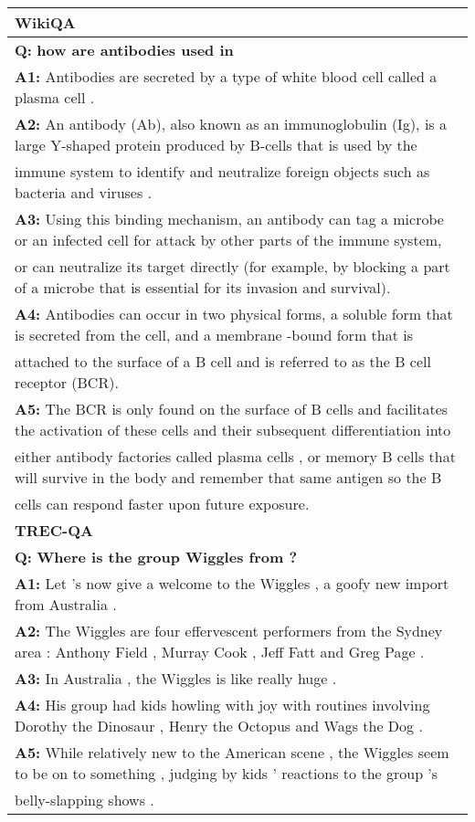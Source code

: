\begin{table*}[t!]
{\begin{tabular}{l}
    \textbf{WikiQA} \\
    \midrule
    \textbf{Q:} \textbf{how are antibodies used in} \\
    \textbf{A1:} {\color{red} Antibodies are secreted by a type of white blood cell called a plasma cell .}\\
    \textbf{A2:} {\color{BlueGreen} An antibody (Ab), also known as an immunoglobulin (Ig), is a large Y-shaped protein produced by B-cells that is used by the }\\{\color{BlueGreen} immune system to identify and neutralize foreign objects such as bacteria and viruses .}\\
    \textbf{A3:}  {\color{ForestGreen}Using this binding mechanism, an antibody can tag a microbe or an infected cell for attack by other parts of the immune system, }\\{\color{ForestGreen}or can neutralize its target directly (for example, by blocking a part of a microbe that is essential for its invasion and survival).} \\
    \textbf{A4:} Antibodies can occur in two physical forms, a soluble form that is secreted from the cell, and a membrane -bound form that is \\ attached to the surface of a B cell and is referred to as the B cell receptor (BCR). \\
    \textbf{A5:} The BCR is only found on the surface of B cells and facilitates the activation of these cells and their subsequent differentiation into \\ either antibody factories called plasma cells , or memory B cells that will survive in the body and remember that same antigen so the B \\ cells can respond faster upon future exposure. \\
    \bottomrule
    \toprule

    \textbf{TREC-QA} \\
    \midrule
    \textbf{Q:} \textbf{Where is the group Wiggles from ?} \\
    \textbf{A1:} {\color{red} Let 's now give a welcome to the Wiggles , a goofy new import from Australia .}\\
    \textbf{A2:} {\color{BlueGreen} The Wiggles are four effervescent performers from the Sydney area : Anthony Field , Murray Cook , Jeff Fatt and Greg Page .} \\
    \textbf{A3:} In Australia , the Wiggles is like really huge . \\
    \textbf{A4:} His group had kids howling with joy with routines involving Dorothy the Dinosaur , Henry the Octopus and Wags the Dog . \\
    \textbf{A5:} While relatively new to the American scene , the Wiggles seem to be on to something , judging by kids ' reactions to the group 's 
    \\ belly-slapping shows . \\
    \bottomrule


\end{tabular}}
\end{table*}
